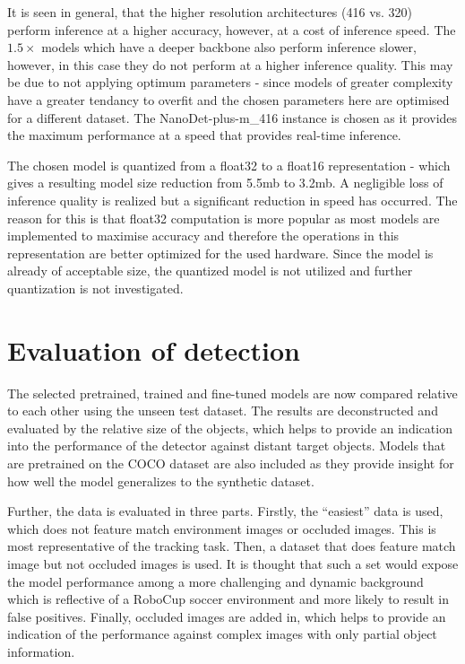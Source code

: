 \documentclass[a4paper,twoside,12pt]{report}
\begin{document}
It is seen in general, that the higher resolution architectures (416 vs. 320) perform inference at a higher accuracy, however, at a cost of inference speed. The $1.5\times$ models which have a deeper backbone also perform inference slower, however, in this case they do not perform at a higher inference quality. This may be due to not applying optimum parameters - since models of greater complexity have a greater tendancy to overfit and the chosen parameters here are optimised for a different dataset. The NanoDet-plus-m\_416 instance is chosen as it provides the maximum performance at a speed that provides real-time inference.

The chosen model is quantized from a float32 to a float16 representation - which gives a resulting model size reduction from 5.5mb to 3.2mb. A negligible loss of inference quality is realized but a significant reduction in speed has occurred. The reason for this is that float32 computation is more popular as most models are implemented to maximise accuracy and therefore the operations in this representation are better optimized for the used hardware. Since the model is already of acceptable size, the quantized model is not utilized and further quantization is not investigated.

\newpage
\section{Evaluation of detection}

The selected pretrained, trained and fine-tuned models are now compared relative to each other using the unseen test dataset. The results are deconstructed and evaluated by the relative size of the objects, which helps to provide an indication into the performance of the detector against distant target objects. Models that are pretrained on the COCO dataset are also included as they provide insight for how well the model generalizes to the synthetic dataset.

Further, the data is evaluated in three parts. Firstly, the ``easiest'' data is used, which does not feature match environment images or occluded images. This is most representative of the tracking task. Then, a dataset that does feature match image but not occluded images is used. It is thought that such a set would expose the model performance among a more challenging and dynamic background which is reflective of a RoboCup soccer environment and more likely to result in false positives. Finally, occluded images are added in, which helps to provide an indication of the performance against complex images with only partial object information. 
\end{document}
